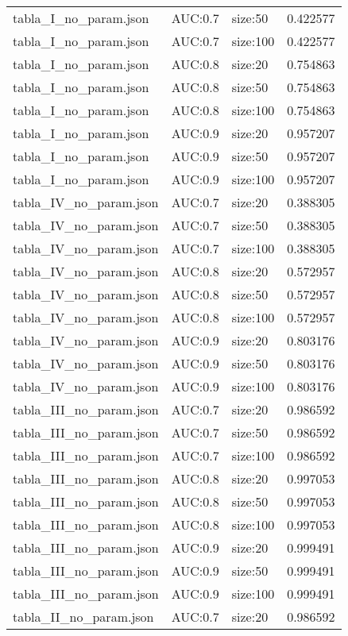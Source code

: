 \begin{tabular}{lllr}
tabla_I_no_param.json & AUC:0.7 & size:50 & 0.422577 \\
tabla_I_no_param.json & AUC:0.7 & size:100 & 0.422577 \\
tabla_I_no_param.json & AUC:0.8 & size:20 & 0.754863 \\
tabla_I_no_param.json & AUC:0.8 & size:50 & 0.754863 \\
tabla_I_no_param.json & AUC:0.8 & size:100 & 0.754863 \\
tabla_I_no_param.json & AUC:0.9 & size:20 & 0.957207 \\
tabla_I_no_param.json & AUC:0.9 & size:50 & 0.957207 \\
tabla_I_no_param.json & AUC:0.9 & size:100 & 0.957207 \\
tabla_IV_no_param.json & AUC:0.7 & size:20 & 0.388305 \\
tabla_IV_no_param.json & AUC:0.7 & size:50 & 0.388305 \\
tabla_IV_no_param.json & AUC:0.7 & size:100 & 0.388305 \\
tabla_IV_no_param.json & AUC:0.8 & size:20 & 0.572957 \\
tabla_IV_no_param.json & AUC:0.8 & size:50 & 0.572957 \\
tabla_IV_no_param.json & AUC:0.8 & size:100 & 0.572957 \\
tabla_IV_no_param.json & AUC:0.9 & size:20 & 0.803176 \\
tabla_IV_no_param.json & AUC:0.9 & size:50 & 0.803176 \\
tabla_IV_no_param.json & AUC:0.9 & size:100 & 0.803176 \\
tabla_III_no_param.json & AUC:0.7 & size:20 & 0.986592 \\
tabla_III_no_param.json & AUC:0.7 & size:50 & 0.986592 \\
tabla_III_no_param.json & AUC:0.7 & size:100 & 0.986592 \\
tabla_III_no_param.json & AUC:0.8 & size:20 & 0.997053 \\
tabla_III_no_param.json & AUC:0.8 & size:50 & 0.997053 \\
tabla_III_no_param.json & AUC:0.8 & size:100 & 0.997053 \\
tabla_III_no_param.json & AUC:0.9 & size:20 & 0.999491 \\
tabla_III_no_param.json & AUC:0.9 & size:50 & 0.999491 \\
tabla_III_no_param.json & AUC:0.9 & size:100 & 0.999491 \\
tabla_II_no_param.json & AUC:0.7 & size:20 & 0.986592 \\

\end{tabular}

